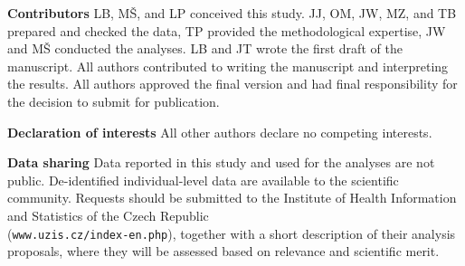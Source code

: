 \documentclass[preprint,12pt,authoryear]{elsarticle}
\begin{document}

{\bf Contributors} LB, M\v{S}, and LP conceived this study. JJ, OM, JW, MZ, and TB prepared and checked the data, TP provided the methodological expertise, JW and M\v{S} conducted the analyses. LB and JT wrote the first draft of the manuscript. All authors contributed to writing the manuscript and interpreting the results. All authors approved the final version and had final responsibility for the decision to submit for publication. 

{\bf Declaration of interests} All other authors declare no competing interests.

{\bf Data sharing} Data reported in this study and used for the analyses are not public. De-identified individual-level data are available to the scientific community. Requests should be submitted to the Institute of Health Information and Statistics of the Czech Republic \\ ({\tt www.uzis.cz/index-en.php}), together with a short description of their analysis proposals, where they will be assessed based on relevance and scientific merit.



 


\end{document}
